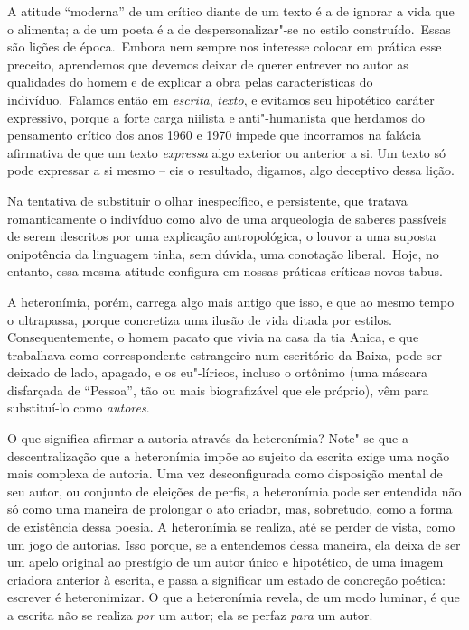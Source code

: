 A atitude ``moderna'' de um crítico diante de um texto é a de ignorar a
vida que o alimenta; a de um poeta é a de despersonalizar"-se no estilo
construído.~Essas são lições de época.~Embora nem sempre nos interesse
colocar em prática esse preceito, aprendemos que devemos deixar de
querer entrever no autor as qualidades do homem e de explicar a obra
pelas características do indivíduo.~Falamos então em \emph{escrita},
\emph{texto}, e evitamos seu hipotético caráter expressivo, porque a
forte carga niilista e anti"-humanista que herdamos do pensamento crítico
dos anos 1960 e 1970 impede que incorramos na falácia afirmativa de que
um texto \emph{expressa} algo exterior ou anterior a si. Um texto só
pode expressar a si mesmo -- eis o resultado, digamos, algo deceptivo
dessa lição.

Na tentativa de substituir o olhar inespecífico, e persistente, que
tratava romanticamente o indivíduo como alvo de uma arqueologia de
saberes passíveis de serem descritos por uma explicação antropológica, o
louvor a uma suposta onipotência da linguagem tinha, sem dúvida, uma
conotação liberal.~Hoje, no entanto, essa mesma atitude configura em
nossas práticas críticas novos tabus.

A heteronímia, porém, carrega algo mais antigo que isso, e que ao mesmo
tempo o ultrapassa, porque concretiza uma ilusão de vida ditada por
estilos. Consequentemente, o homem pacato que vivia na casa da tia
Anica, e que trabalhava como correspondente estrangeiro num escritório
da Baixa, pode ser deixado de lado, apagado, e os eu"-líricos, incluso o
ortônimo (uma máscara disfarçada de ``Pessoa'', tão ou mais
biografizável que ele próprio), vêm para substituí-lo como
\emph{autores}.

O que significa afirmar a autoria através da heteronímia? Note"-se que a
descentralização que a heteronímia impõe ao sujeito da escrita exige uma
noção mais complexa de autoria. Uma vez desconfigurada como disposição
mental de seu autor, ou conjunto de eleições de perfis, a heteronímia
pode ser entendida não só como uma maneira de prolongar o ato criador,
mas, sobretudo, como a forma de existência dessa poesia. A heteronímia
se realiza, até se perder de vista, como um jogo de autorias. Isso
porque, se a entendemos dessa maneira, ela deixa de ser um apelo
original ao prestígio de um autor único e hipotético, de uma imagem
criadora anterior à escrita, e passa a significar um estado de concreção
poética: escrever é heteronimizar. O que a heteronímia revela, de um
modo luminar, é que a escrita não se realiza \emph{por} um autor; ela se
perfaz \emph{para} um autor.


